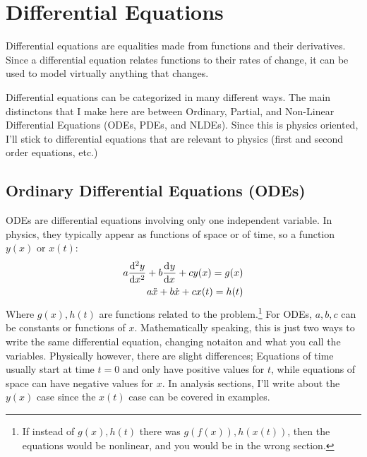 \setlength{\columnseprule}{1pt}
\section{Differential Equations} 
    Differential equations are equalities made from functions and their derivatives. Since a differential equation relates  functions to their rates of change, it can be used to model virtually anything that changes. 
    \par
    Differential equations can be categorized in many different ways. The main distinctons that I make here are between Ordinary, Partial, and Non-Linear Differential Equations (ODEs, PDEs, and NLDEs). Since this is physics oriented, I'll stick to differential equations that are relevant to physics (first and second order equations, etc.)
\par
%

\subsection{Ordinary Differential Equations (ODEs)}
    ODEs are differential equations involving only one independent variable. In physics, they typically appear as functions of space or of time, so a function $y(x)$ or $x(t)$: 
    \begin{align}
        a\der[2]{y}{x}+b\der{y}{x}+cy(x)=g(x)\label{eqn:ode}
        \\
        a\Ddot{x}+b\dot{x}+cx(t)=h(t)\notag
    \end{align}
    Where $g(x),h(t)$ are functions related to the problem.\footnote{If instead of $g(x),h(t)$ there was $g(f(x)),h(x(t))$, then the equations would be nonlinear, and you would be in the wrong section.} For ODEs, $a,b,c$ can be constants or functions of $x$. Mathematically speaking, this is just two ways to write the same differential equation, changing notaiton and what you call the variables. Physically however, there are slight differences; Equations of time usually start at time $t=0$ and only have positive values for $t$, while equations of space can have negative values for $x$. In analysis sections, I'll write about the $y(x)$ case since the $x(t)$ case can be covered in examples.
